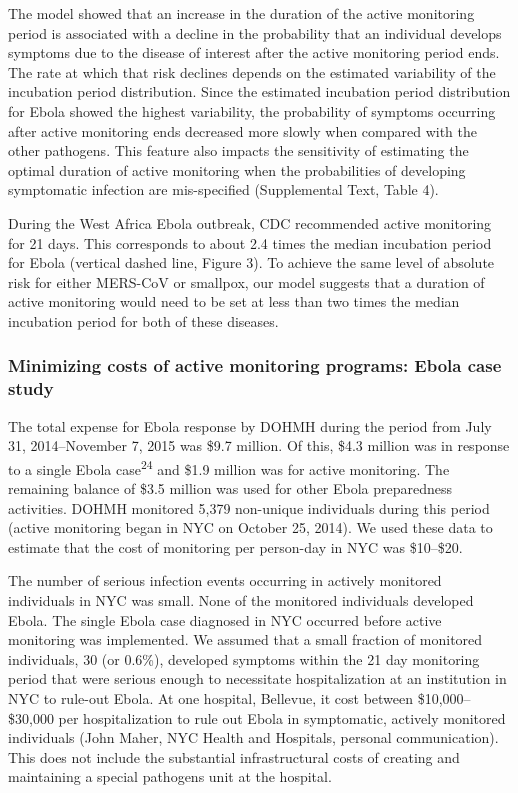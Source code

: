 \documentclass[]{article}
\begin{document}
The model showed that an increase in the duration of the active
monitoring period is associated with a decline in the probability that
an individual develops symptoms due to the disease of interest after the
active monitoring period ends. The rate at which that risk declines
depends on the estimated variability of the incubation period
distribution. Since the estimated incubation period distribution for
Ebola showed the highest variability, the probability of symptoms
occurring after active monitoring ends decreased more slowly when
compared with the other pathogens. This feature also impacts the
sensitivity of estimating the optimal duration of active monitoring when
the probabilities of developing symptomatic infection are mis-specified
(Supplemental Text, Table 4).

During the West Africa Ebola outbreak, CDC recommended active monitoring
for 21 days. This corresponds to about 2.4 times the median incubation
period for Ebola (vertical dashed line, Figure 3). To achieve the same
level of absolute risk for either MERS-CoV or smallpox, our model
suggests that a duration of active monitoring would need to be set at
less than two times the median incubation period for both of these
diseases.

\subsubsection{Minimizing costs of active monitoring programs: Ebola
case
study}\label{minimizing-costs-of-active-monitoring-programs-ebola-case-study}

The total expense for Ebola response by DOHMH during the period from
July 31, 2014--November 7, 2015 was \$9.7 million. Of this, \$4.3
million was in response to a single Ebola case\textsuperscript{24} and
\$1.9 million was for active monitoring. The remaining balance of \$3.5
million was used for other Ebola preparedness activities. DOHMH
monitored 5,379 non-unique individuals during this period (active
monitoring began in NYC on October 25, 2014). We used these data to
estimate that the cost of monitoring per person-day in NYC was
\$10--\$20.

The number of serious infection events occurring in actively monitored
individuals in NYC was small. None of the monitored individuals
developed Ebola. The single Ebola case diagnosed in NYC occurred before
active monitoring was implemented. We assumed that a small fraction of
monitored individuals, 30 (or 0.6\%), developed symptoms within the 21
day monitoring period that were serious enough to necessitate
hospitalization at an institution in NYC to rule-out Ebola. At one
hospital, Bellevue, it cost between \$10,000--\$30,000 per
hospitalization to rule out Ebola in symptomatic, actively monitored
individuals (John Maher, NYC Health and Hospitals, personal
communication). This does not include the substantial infrastructural
costs of creating and maintaining a special pathogens unit at the
hospital.
\end{document}
